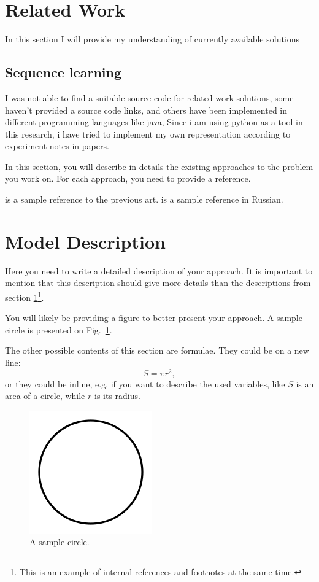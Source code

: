 \documentclass{article}
\begin{document}
\section{Related Work}
\label{sec:related}

In this section I will provide my understanding of currently available solutions 

\subsection{Sequence learning}




I was not able to find a suitable source code for related work solutions, some haven't provided a source code links, and others have been implemented in different programming languages like java, 
Since i am using python as a tool in this research, i have tried to implement my own representation according to experiment notes in papers.

In this section, you will describe in details the existing approaches to the problem you work on. For each approach, you need to provide a reference. 

\cite{levenshtein1966binary} is a sample reference to the previous art. \cite{levenshtein1966dvoichnie} is a sample reference in Russian.

\section{Model Description}
Here you need to write a detailed description of your approach. It is important to mention that this description should give more details than the descriptions from section \ref{sec:related}\footnote{This is an example of internal references and footnotes at the same time.}. 

You will likely be providing a figure to better present your approach. A sample circle is presented on Fig.~\ref{fig:circle}.

The other possible contents of this section are formulae. They could be on a new line:
$$S=\pi r^2,$$
or they could be inline, e.g. if you want to describe the used variables, like $S$ is an area of a circle, while $r$ is its radius. 

\begin{figure}[!tbh]
    \centering
    \includegraphics[width=0.3\linewidth]{circle.png}
    \caption{A sample circle.}
    \label{fig:circle}
\end{figure}
\end{document}
